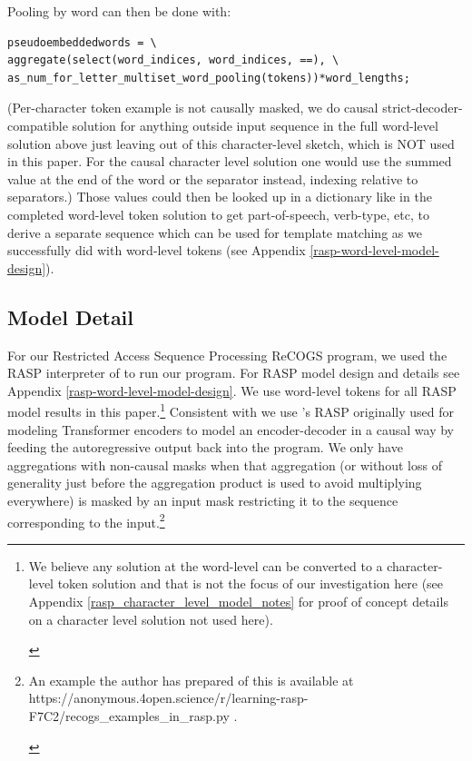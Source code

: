 \documentclass[11pt]{article}
\begin{document}
Pooling by word can then be done with:
\begin{tiny}
\begin{verbatim}
pseudoembeddedwords = \
aggregate(select(word_indices, word_indices, ==), \
as_num_for_letter_multiset_word_pooling(tokens))*word_lengths;
\end{verbatim}
\end{tiny}
(Per-character token example is not causally masked, we do causal strict-decoder-compatible solution for anything outside input sequence in the full word-level solution above just leaving out of this character-level sketch, which is NOT used in this paper. For the causal character level solution one would use the summed value at the end of the word or the separator instead, indexing relative to separators.) 
\clearpage
Those values could then be looked up in a dictionary like in the completed word-level token solution to get part-of-speech, verb-type, etc, to derive a separate sequence which can be used for template matching as we successfully did with word-level tokens (see Appendix \ref{rasp-word-level-model-design}).


\clearpage

\subsection{Model Detail}
\label{model_detail}

For our Restricted Access Sequence Processing ReCOGS program, we used the RASP interpreter of \cite{Weiss2021} to run our program. For RASP model design and details see Appendix \ref{rasp-word-level-model-design}. We use word-level tokens for all RASP model results in this paper.\footnote{\begin{footnotesize}We believe any solution at the word-level can be converted to a character-level token solution and that is not the focus of our investigation here (see Appendix \ref{rasp_character_level_model_notes} for proof of concept details on a character level solution not used here).\end{footnotesize}}
Consistent with \cite{Zhou2024} we use \cite{Weiss2021}'s RASP originally used for modeling Transformer encoders to model an encoder-decoder in a causal way by feeding the autoregressive output back into the program. We only have aggregations with non-causal masks when that aggregation (or without loss of generality just before the aggregation product is used to avoid multiplying everywhere) is masked by an input mask restricting it to the sequence corresponding to the input.\footnote{\begin{footnotesize}An example the author has prepared of this is available at 
https://anonymous.4open.science/r/learning-rasp-F7C2/recogs\_examples\_in\_rasp.py .\end{footnotesize}}
\end{document}
